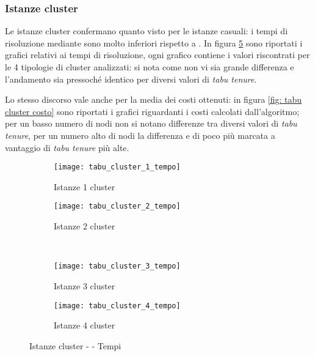 \subsubsection{Istanze cluster}
Le istanze cluster confermano quanto visto per le istanze casuali: i tempi di risoluzione mediante \tabu sono molto inferiori rispetto a .
In figura \ref{fig: tabu cluster tempo} sono riportati i grafici relativi ai tempi di risoluzione, ogni grafico contiene i valori riscontrati per le 4 tipologie di cluster analizzati: si nota come non vi sia grande differenza e l'andamento sia pressoché identico per diversi valori di \emph{tabu tenure}.

Lo stesso discorso vale anche per la media dei costi ottenuti: in figura \ref{fig: tabu cluster costo} sono riportati i grafici riguardanti i costi calcolati dall'algoritmo; per un basso numero di nodi non si notano differenze tra diversi valori di \emph{tabu tenure}, per un numero alto di nodi la differenza e di poco più marcata a vantaggio di \emph{tabu tenure} più alte.

\begin{figure}[H]
	\centering
	\begin{subfigure}[b]{.45\textwidth}
		\texttt{[image: tabu\_cluster\_1\_tempo]}
		\caption{Istanze 1 cluster}
		\label{fig:tabu cluster 1 tempo}
	\end{subfigure}
	\quad
	\begin{subfigure}[b]{.45\textwidth}
		\texttt{[image: tabu\_cluster\_2\_tempo]}
		\caption{Istanze 2 cluster}
		\label{fig:tabu cluster 2 tempo}
	\end{subfigure}
	\\
	\begin{subfigure}[b]{.45\textwidth}
		\texttt{[image: tabu\_cluster\_3\_tempo]}
		\caption{Istanze 3 cluster}
		\label{fig:tabu cluster 3 tempo}
	\end{subfigure}
	\quad
	\begin{subfigure}[b]{.45\textwidth}
		\texttt{[image: tabu\_cluster\_4\_tempo]}
		\caption{Istanze 4 cluster}
		\label{fig:tabu cluster 4 tempo}
	\end{subfigure}
	\caption{Istanze cluster - \tabu{} - Tempi}
	\label{fig: tabu cluster tempo}
\end{figure}



